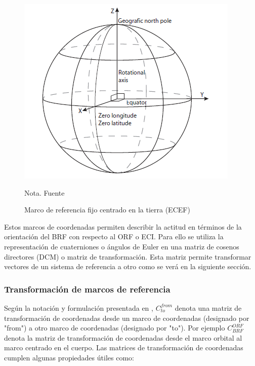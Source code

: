  \begin{figure}[!ht]
	\begin{center}
		\includegraphics[scale=0.7]{imagenes/marco_teorico/ECEF.PNG}\\
	\end{center}
	\caption{ Marco de referencia fijo centrado en la tierra (ECEF)}
	\label{fig:ECEF}
	\footnotesize{Nota. Fuente \cite{Andresen2005}}
\end{figure}

Estos marcos de coordenadas permiten describir la actitud en términos de la orientación del BRF con respecto al ORF o ECI. Para ello se utiliza la representación de cuaterniones o ángulos de Euler en una matriz de cosenos directores (DCM) o matriz de transformación. Esta matriz permite transformar vectores de un sistema de referencia a otro como se verá en la siguiente sección.

\subsubsection{Transformación de marcos de referencia}
\hfill \break
Según la notación y formulación presentada en \cite{grewal2007global},  $C_{to}^{from}$ denota una matriz de transformación de coordenadas desde un
marco de coordenadas (designado por "from") a otro marco de coordenadas (designado por "to"). Por ejemplo $C_{BRF}^{ORF}$ denota la matriz de transformación de coordenadas desde el marco orbital al marco centrado en el cuerpo. Las matrices de transformación de coordenadas cumplen algunas propiedades útiles como:

